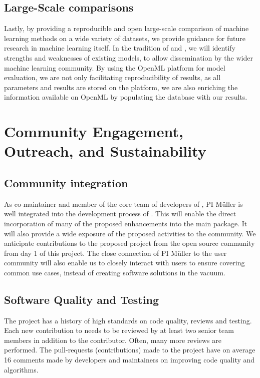 \subsection{Large-Scale comparisons}
Lastly, by providing a reproducible and open large-scale comparison of machine learning
methods on a wide variety of datasets, we provide guidance for future research
in machine learning itself.
In the tradition of \textcite{caruana2006empirical} and
\textcite{caruana2008empirical}, we will identify strengths and weaknesses of
existing models, to allow dissemination by the wider machine learning
community. By using the OpenML platform for model evaluation, we are
not only facilitating reproducibility of results, as all parameters and results
are stored on the platform, we are also enriching the information available on OpenML
by populating the database with our results.

\section{Community Engagement, Outreach, and Sustainability}
\subsection{Community integration}
As co-maintainer and member of the core team of developers of \sklearn{}, PI
M\"uller is well integrated into the development process of \sklearn{}.
This will enable the direct incorporation of many of the proposed enhancements
into the \sklearn{} main package.
It will also provide a wide exposure of the proposed activities to the
\sklearn{} community. We anticipate contributions to the proposed
project from the open source community from day 1 of this project.
The close connection of PI M\"uller to the \sklearn{} user community will
also enable us to closely interact with users to ensure covering common use cases,
instead of creating software solutions in the vacuum.

\subsection{Software Quality and Testing}
The \sklearn{} project has a history of high standards on code quality, reviews and testing.
Each new contribution to \sklearn{} needs to be reviewed by at least two senior team members
in addition to the contributor. Often, many more reviews are performed. The
pull-requests (contributions) made to the project have on average 16 comments
made by developers and maintainers on improving code quality and algorithms.

